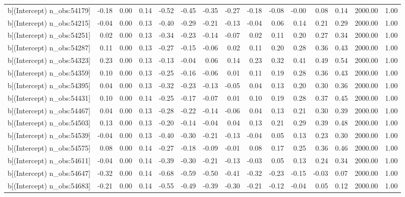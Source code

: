 \begin{table}[ht]
\begin{tabular}{rrrrrrrrrrrrrrr}
  b[(Intercept) n\_obs:54179] & -0.18 & 0.00 & 0.14 & -0.52 & -0.45 & -0.35 & -0.27 & -0.18 & -0.08 & -0.00 & 0.08 & 0.14 & 2000.00 & 1.00 \\ 
  b[(Intercept) n\_obs:54215] & -0.04 & 0.00 & 0.13 & -0.40 & -0.29 & -0.21 & -0.13 & -0.04 & 0.06 & 0.14 & 0.21 & 0.29 & 2000.00 & 1.00 \\ 
  b[(Intercept) n\_obs:54251] & 0.02 & 0.00 & 0.13 & -0.34 & -0.23 & -0.14 & -0.07 & 0.02 & 0.11 & 0.20 & 0.27 & 0.34 & 2000.00 & 1.00 \\ 
  b[(Intercept) n\_obs:54287] & 0.11 & 0.00 & 0.13 & -0.27 & -0.15 & -0.06 & 0.02 & 0.11 & 0.20 & 0.28 & 0.36 & 0.43 & 2000.00 & 1.00 \\ 
  b[(Intercept) n\_obs:54323] & 0.23 & 0.00 & 0.13 & -0.13 & -0.04 & 0.06 & 0.14 & 0.23 & 0.32 & 0.41 & 0.49 & 0.54 & 2000.00 & 1.00 \\ 
  b[(Intercept) n\_obs:54359] & 0.10 & 0.00 & 0.13 & -0.25 & -0.16 & -0.06 & 0.01 & 0.11 & 0.19 & 0.28 & 0.36 & 0.43 & 2000.00 & 1.00 \\ 
  b[(Intercept) n\_obs:54395] & 0.04 & 0.00 & 0.13 & -0.32 & -0.23 & -0.13 & -0.05 & 0.04 & 0.13 & 0.20 & 0.30 & 0.36 & 2000.00 & 1.00 \\ 
  b[(Intercept) n\_obs:54431] & 0.10 & 0.00 & 0.14 & -0.25 & -0.17 & -0.07 & 0.01 & 0.10 & 0.19 & 0.28 & 0.37 & 0.45 & 2000.00 & 1.00 \\ 
  b[(Intercept) n\_obs:54467] & 0.04 & 0.00 & 0.13 & -0.28 & -0.22 & -0.14 & -0.06 & 0.04 & 0.13 & 0.21 & 0.30 & 0.39 & 2000.00 & 1.00 \\ 
  b[(Intercept) n\_obs:54503] & 0.13 & 0.00 & 0.13 & -0.20 & -0.14 & -0.04 & 0.04 & 0.13 & 0.21 & 0.29 & 0.39 & 0.48 & 2000.00 & 1.00 \\ 
  b[(Intercept) n\_obs:54539] & -0.04 & 0.00 & 0.13 & -0.40 & -0.30 & -0.21 & -0.13 & -0.04 & 0.05 & 0.13 & 0.23 & 0.30 & 2000.00 & 1.00 \\ 
  b[(Intercept) n\_obs:54575] & 0.08 & 0.00 & 0.14 & -0.27 & -0.18 & -0.09 & -0.01 & 0.08 & 0.17 & 0.25 & 0.36 & 0.46 & 2000.00 & 1.00 \\ 
  b[(Intercept) n\_obs:54611] & -0.04 & 0.00 & 0.14 & -0.39 & -0.30 & -0.21 & -0.13 & -0.03 & 0.05 & 0.13 & 0.24 & 0.34 & 2000.00 & 1.00 \\ 
  b[(Intercept) n\_obs:54647] & -0.32 & 0.00 & 0.14 & -0.68 & -0.59 & -0.50 & -0.41 & -0.32 & -0.23 & -0.15 & -0.03 & 0.07 & 2000.00 & 1.00 \\ 
  b[(Intercept) n\_obs:54683] & -0.21 & 0.00 & 0.14 & -0.55 & -0.49 & -0.39 & -0.30 & -0.21 & -0.12 & -0.04 & 0.05 & 0.12 & 2000.00 & 1.00 \\ 

\end{tabular}
\end{table}
